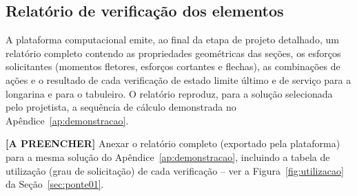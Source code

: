 \begin{appendices}
\section{Relatório de verificação dos elementos}\label{ap:relatorio}

A plataforma computacional emite, ao final da etapa de projeto detalhado, um relatório completo contendo as propriedades geométricas das seções, os esforços solicitantes (momentos fletores, esforços cortantes e flechas), as combinações de ações e o resultado de cada verificação de estado limite último e de serviço para a longarina e para o tabuleiro. O relatório reproduz, para a solução selecionada pelo projetista, a sequência de cálculo demonstrada no Apêndice~\ref{ap:demonstracao}.

\begin{fillblock}
\noindent\textbf{[A PREENCHER]} Anexar o relatório completo (exportado pela plataforma) para a mesma solução do Apêndice~\ref{ap:demonstracao}, incluindo a tabela de utilização (grau de solicitação) de cada verificação -- ver a Figura~\ref{fig:utilizacao} da Seção~\ref{sec:ponte01}.
\end{fillblock}

\end{appendices}
